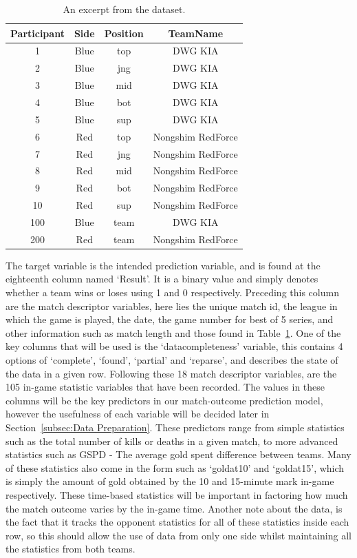 \begin{table}[h!]
\centering
\caption{An excerpt from the dataset.}
\begin{tabular}{ c c c c }
 \hline
 Participant & Side & Position & TeamName \\ [0.5ex]
 \hline
 1 & Blue & top & DWG KIA \\
 2 & Blue & jng & DWG KIA \\
 3 & Blue & mid & DWG KIA \\
 4 & Blue & bot & DWG KIA \\
 5 & Blue & sup & DWG KIA \\
 6 & Red & top & Nongshim RedForce \\
 7 & Red & jng & Nongshim RedForce \\
 8 & Red & mid & Nongshim RedForce \\
 9 & Red & bot & Nongshim RedForce \\
 10 & Red & sup & Nongshim RedForce \\
 100 & Blue & team & DWG KIA \\
 200 & Red & team & Nongshim RedForce \\ [1ex]
 \hline
\end{tabular}
\label{tab:1}
\end{table}

The target variable is the intended prediction variable, and is found at the eighteenth column named `Result'.
It is a binary value and simply denotes whether a team wins or loses using 1 and 0 respectively.
Preceding this column are the match descriptor variables, here lies the unique match id, the league in which the game is played, the date, the game number for best of 5 series, and other information such as match length and those found in Table~\ref{tab:1}.
One of the key columns that will be used is the `datacompleteness' variable, this contains 4 options of `complete', `found', `partial' and `reparse', and describes the state of the data in a given row.
Following these 18 match descriptor variables, are the 105 in-game statistic variables that have been recorded.
The values in these columns will be the key predictors in our match-outcome prediction model, however the usefulness of each variable will be decided later in Section~\ref{subsec:Data Preparation}.
These predictors range from simple statistics such as the total number of kills or deaths in a given match, to more advanced statistics such as GSPD - The average gold spent difference between teams.
Many of these statistics also come in the form such as `goldat10' and `goldat15', which is simply the amount of gold obtained by the 10 and 15-minute mark in-game respectively.
These time-based statistics will be important in factoring how much the match outcome varies by the in-game time.
Another note about the data, is the fact that it tracks the opponent statistics for all of these statistics inside each row, so this should allow the use of data from only one side whilst maintaining all the statistics from both teams.

